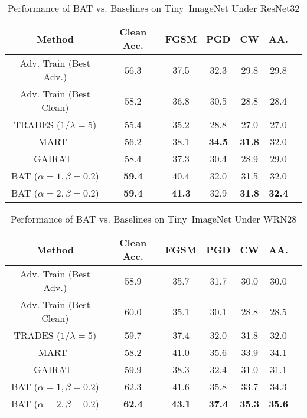 \begin{table}[h]
\small
\centering
\caption{Performance of BAT vs. Baselines on Tiny~ImageNet Under ResNet32}
\label{tab:resnet18_imagenet}
\begin{tabular}{c|c|ccccc}
\hline
Method & Clean Acc. & FGSM & PGD & CW & AA. \\
\hline
\hline
Adv. Train (Best Adv.) & 56.3 & 37.5 & 32.3 & 29.8 & 29.8\\
Adv. Train (Best Clean) & 58.2 & 36.8 & 30.5 & 28.8 & 28.4\\
TRADES ($1/\lambda = 5$) & 55.4 & 35.2 & 28.8 & 27.0 & 27.0\\
MART~\cite{wang2019improving} & 56.2 & 38.1& \textbf{34.5} & \textbf{31.8} & 32.0\\
GAIRAT~\cite{zhang2020geometry} & 58.4 & 37.3& 30.4 & 28.9 & 29.0\\
\hline
BAT ($\alpha = 1, \beta = 0.2$) & \textbf{59.4} &40.4 &32.0 & 31.5 & 32.0\\
BAT ($\alpha = 2, \beta = 0.2$) & \textbf{59.4} & \textbf{41.3}  &32.9 & \textbf{31.8} & \textbf{32.4}\\
\hline
\hline
\end{tabular}
\end{table}
\begin{table}[h!]
\small
\centering
\caption{Performance of BAT vs. Baselines on Tiny~ImageNet Under WRN28}
\label{tab:wrn28_imagenet}
\begin{tabular}{c|c|ccccc}
\hline
Method & Clean Acc. & FGSM & PGD & CW & AA. \\
\hline
\hline
Adv. Train (Best Adv.) & 58.9 & 35.7 & 31.7 & 30.0 & 30.0  \\
Adv. Train (Best Clean) & 60.0 & 35.1 & 30.1 & 28.8 & 28.5\\
TRADES ($1/\lambda = 5$) & 59.7 & 37.4 & 32.0 & 31.8 & 32.0\\
MART~\cite{wang2019improving} & 58.2 & 41.0 & 35.6 & 33.9 & 34.1 \\
GAIRAT~\cite{zhang2020geometry} & 59.9 & 38.3 & 32.4 & 31.0 & 31.1\\
\hline
BAT ($\alpha = 1, \beta = 0.2$) & 62.3 & 41.6 & 35.8 & 33.7 & 34.3 \\
BAT ($\alpha = 2, \beta = 0.2$) & \textbf{62.4} & \textbf{43.1} &\textbf{37.4} & \textbf{35.3} & \textbf{35.6}\\
\hline
\hline
\end{tabular}
\end{table}



